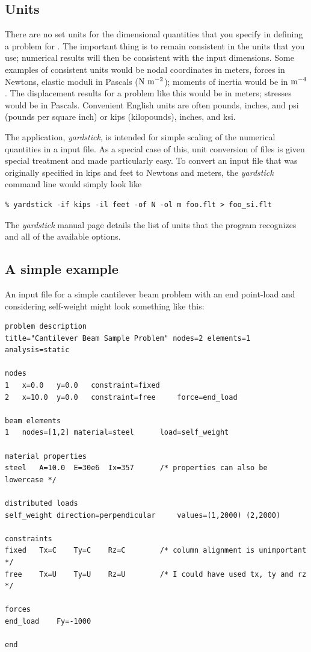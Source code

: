 \subsection{Units}

There are no set units for the dimensional quantities that you specify in
defining a problem for \felt{}.  The important thing is to remain consistent
in the units that you use; numerical results will then be consistent with 
the input dimensions.  Some examples of consistent units would be nodal
coordinates in meters, forces in Newtons, elastic moduli in Pascals 
(${\rm N\ m^{-2}}$); moments of inertia would be in ${\rm m^{-4}}$.  The 
displacement results for a problem like this would be in meters; stresses would be
in Pascals.  Convenient English units are often pounds, inches, and 
psi (pounds per square inch) or kips (kilopounds), inches, and ksi.

The \felt{} application, {\em yardstick}, is intended for simple scaling of
the numerical quantities in a \felt{} input file.  As a special case of
this, unit conversion of files is given special treatment and made particularly
easy.  To convert an input file that was originally specified in kips and
feet to Newtons and meters, the {\em yardstick} command line would simply
look like
\begin{screen}
 \begin{verbatim}
% yardstick -if kips -il feet -of N -ol m foo.flt > foo_si.flt
 \end{verbatim}
\end{screen}
The {\em yardstick} manual page details the list of units that the program
recognizes and all of the available options.

\subsection{A simple example}

An input file for a simple 
cantilever beam problem with an end point-load and considering self-weight 
might look something like this:	

\begin{screen}
 \begin{verbatim}
problem description
title="Cantilever Beam Sample Problem" nodes=2 elements=1 analysis=static

nodes
1 	x=0.0	y=0.0	constraint=fixed
2	x=10.0	y=0.0	constraint=free		force=end_load

beam elements
1 	nodes=[1,2]	material=steel		load=self_weight

material properties
steel	A=10.0	E=30e6	Ix=357		/* properties can also be lowercase */

distributed loads
self_weight	direction=perpendicular		values=(1,2000) (2,2000)

constraints
fixed	Tx=C	Ty=C	Rz=C		/* column alignment is unimportant */
free	Tx=U	Ty=U	Rz=U		/* I could have used tx, ty and rz */

forces
end_load	Fy=-1000

end
 \end{verbatim}
\end{screen}

